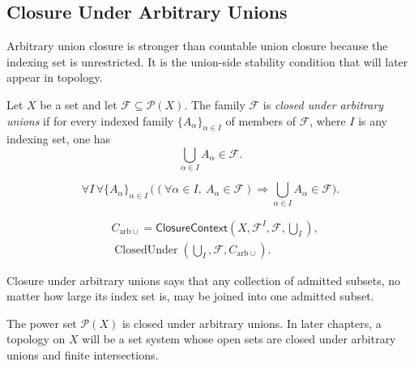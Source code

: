 \subsection{Closure Under Arbitrary Unions}

\begin{remark*}[Exposition]
Arbitrary union closure is stronger than countable union closure because the
indexing set is unrestricted.  It is the union-side stability condition that
will later appear in topology.
\end{remark*}

\begin{definition}\label{def:closed-under-arbitrary-unions}
Let \(X\) be a set and let \(\mathcal{F}\subseteq\mathcal{P}(X)\).  The family
\(\mathcal{F}\) is \emph{closed under arbitrary unions} if for every indexed
family \(\{A_\alpha\}_{\alpha\in I}\) of members of \(\mathcal{F}\), where
\(I\) is any indexing set, one has
\[
  \bigcup_{\alpha\in I} A_\alpha \in \mathcal{F}.
\]
\end{definition}

\begin{remark*}
\[
  \forall I\,\forall \{A_\alpha\}_{\alpha\in I}\,
  \bigl((\forall \alpha\in I,\ A_\alpha\in\mathcal{F})
  \Rightarrow
  \bigcup_{\alpha\in I}A_\alpha\in\mathcal{F}\bigr).
\]
\end{remark*}

\begin{remark*}
\[
\begin{aligned}
&C_{\mathrm{arb}\cup}
=\mathsf{ClosureContext}(X,\mathcal{F}^{I},\mathcal{F},\bigcup_{I}),\\
&\operatorname{ClosedUnder}(\bigcup_{I},\mathcal{F},C_{\mathrm{arb}\cup}).
\end{aligned}
\]
\end{remark*}

\begin{remark*}[Interpretation]
Closure under arbitrary unions says that any collection of admitted subsets,
no matter how large its index set is, may be joined into one admitted subset.
\end{remark*}

\begin{remark*}[Examples]
The power set \(\mathcal{P}(X)\) is closed under arbitrary unions.  In later
chapters, a topology on \(X\) will be a set system whose open sets are closed
under arbitrary unions and finite intersections.
\end{remark*}

